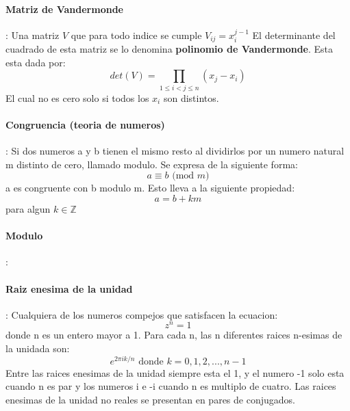 \documentclass[12pt, oneside]{article}
\newcommand{\Z}{\mathbb{Z}}
\begin{document}
\paragraph{Matriz de Vandermonde}:
Una matriz $V$ que para todo indice se cumple $V_{ij}=x_i^{j-1}$
El determinante del cuadrado de esta matriz se lo denomina \textbf{polinomio de Vandermonde}.
Esta esta dada por:
\begin{equation*}
  det(V) = \prod_{1\leq i < j \leq n}(x_j-x_i)
\end{equation*}
El cual no es cero solo si todos los $x_i$ son distintos.

\vspace{0.3cm}
\paragraph{Congruencia (teoria de numeros)}:
Si dos numeros a y b tienen el mismo resto al dividirlos por un numero natural
m distinto de cero, llamado modulo.
Se expresa de la siguiente forma:
\begin{equation*}
a \equiv b \text{ (mod } m)
\end{equation*}
a es congruente con b modulo m.
Esto lleva a la siguiente propiedad:
\begin{equation*}
  a = b + km
\end{equation*}
para algun $k\in \Z$


\vspace{0.3cm}
\paragraph{Modulo}:

\vspace{0.3cm}
\paragraph{Raiz enesima de la unidad}:
Cualquiera de los numeros compejos que satisfacen la ecuacion:
\begin{equation*}
  z^n=1
\end{equation*}
donde n es un entero mayor a 1.
Para cada n, las n diferentes raices n-esimas de la unidada son:
\begin{equation*}
  e^{2\pi ik/n} \text{ donde } k=0,1,2,...,n-1
\end{equation*}
Entre las raices enesimas de la unidad siempre esta el 1, y el numero -1 solo
esta cuando n es par y los numeros i e -i cuando n es multiplo de cuatro.
Las raices enesimas de la unidad no reales se presentan en pares de conjugados.
\end{document}
